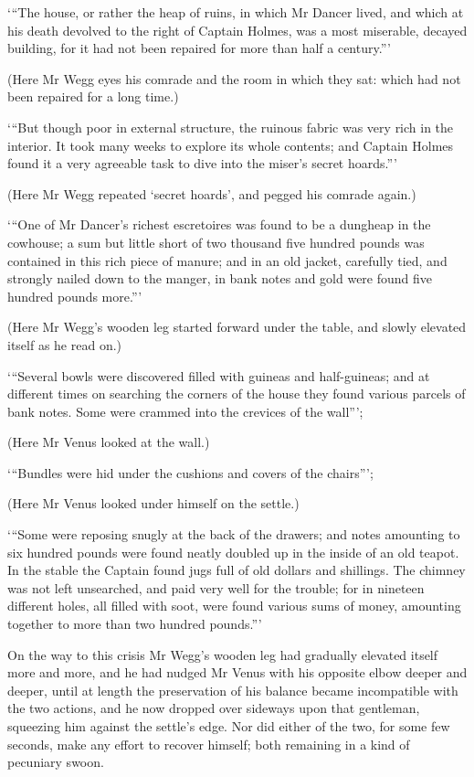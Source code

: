 ‘“The house, or rather the heap of ruins, in which Mr Dancer lived, and
which at his death devolved to the right of Captain Holmes, was a most
miserable, decayed building, for it had not been repaired for more than
half a century.”’

(Here Mr Wegg eyes his comrade and the room in which they sat: which had
not been repaired for a long time.)

‘“But though poor in external structure, the ruinous fabric was very
rich in the interior. It took many weeks to explore its whole contents;
and Captain Holmes found it a very agreeable task to dive into the
miser’s secret hoards.”’

(Here Mr Wegg repeated ‘secret hoards’, and pegged his comrade again.)

‘“One of Mr Dancer’s richest escretoires was found to be a dungheap in
the cowhouse; a sum but little short of two thousand five hundred
pounds was contained in this rich piece of manure; and in an old jacket,
carefully tied, and strongly nailed down to the manger, in bank notes
and gold were found five hundred pounds more.”’

(Here Mr Wegg’s wooden leg started forward under the table, and slowly
elevated itself as he read on.)

‘“Several bowls were discovered filled with guineas and half-guineas;
and at different times on searching the corners of the house they found
various parcels of bank notes. Some were crammed into the crevices of
the wall”’;

(Here Mr Venus looked at the wall.)

‘“Bundles were hid under the cushions and covers of the chairs”’;

(Here Mr Venus looked under himself on the settle.)

‘“Some were reposing snugly at the back of the drawers; and notes
amounting to six hundred pounds were found neatly doubled up in the
inside of an old teapot. In the stable the Captain found jugs full of
old dollars and shillings. The chimney was not left unsearched, and paid
very well for the trouble; for in nineteen different holes, all filled
with soot, were found various sums of money, amounting together to more
than two hundred pounds.”’

On the way to this crisis Mr Wegg’s wooden leg had gradually elevated
itself more and more, and he had nudged Mr Venus with his opposite
elbow deeper and deeper, until at length the preservation of his balance
became incompatible with the two actions, and he now dropped over
sideways upon that gentleman, squeezing him against the settle’s edge.
Nor did either of the two, for some few seconds, make any effort to
recover himself; both remaining in a kind of pecuniary swoon.

